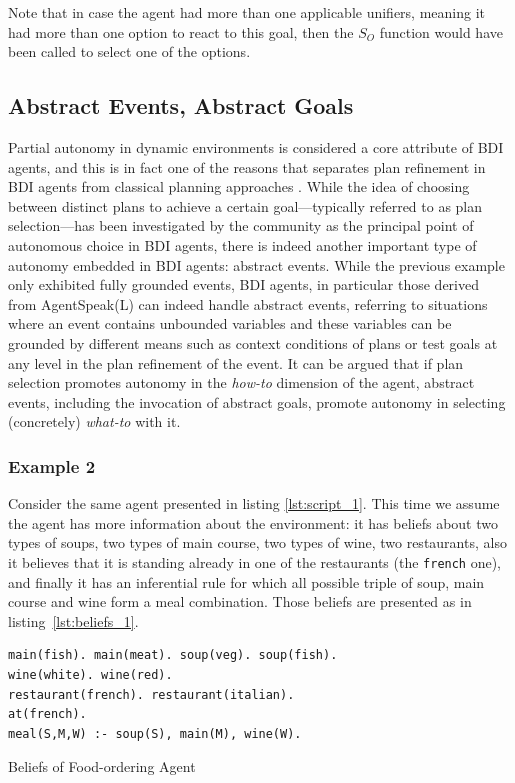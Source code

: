 Note that in case the agent had more than one applicable unifiers, meaning it had more than one option to react to this goal, then the $S_O$ function would have been called to select one of the options. 


\subsection{Abstract Events, Abstract Goals}
Partial autonomy in dynamic environments is considered a core attribute of BDI agents, and this is in fact one of the reasons that separates plan refinement in BDI agents from classical planning approaches \cite{DeSilva2004}. While the idea of choosing between distinct plans to achieve a certain goal---typically referred to as plan selection---has been investigated by the community as the principal point of autonomous choice in BDI agents, there is indeed another important type of autonomy embedded in BDI agents: abstract events. While the previous example only exhibited fully grounded events, BDI agents, in particular those derived from  AgentSpeak(L)  \cite{Rao1995,RaoAS1996} 
can indeed handle abstract events, referring to situations where an event contains unbounded variables and these variables can be grounded by different means such as context conditions of plans or test goals at any level in the plan refinement of the event. It can be argued that if plan selection promotes autonomy in the \textit{how-to} dimension of the agent, abstract events, including the invocation of abstract goals, promote autonomy in selecting (concretely) \textit{what-to} with it.

\subsubsection*{Example 2}
Consider the same agent presented in listing \ref{lst:script_1}. This time we assume the agent has more information about the environment: it has beliefs about two types of soups, two types of main course, two types of wine, two restaurants, also it believes that it is standing already in one of the restaurants (the \texttt{french} one), and finally it has an inferential rule for which all possible triple of soup, main course and wine form  a meal combination. Those beliefs are presented as in listing~\ref{lst:beliefs_1}.

\begin{listing}[t]
\centering
\begin{verbatim}
main(fish). main(meat). soup(veg). soup(fish).
wine(white). wine(red).
restaurant(french). restaurant(italian).
at(french).
meal(S,M,W) :- soup(S), main(M), wine(W).
\end{verbatim}
    \caption{Beliefs of Food-ordering Agent}
    \label{lst:beliefs_1}
\end{listing}


